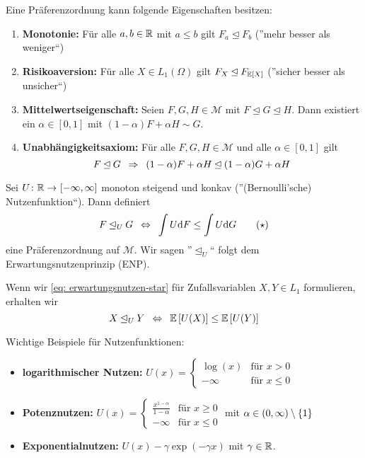 Eine Präferenzordnung kann folgende Eigenschaften besitzen:
\begin{enumerate}[label=(\Roman*)]
	\item \textbf{Monotonie:} Für alle $a,b \in \mathbb{R}$ mit $a \le b$ gilt $F_a \unlhd F_b$ (''mehr besser als weniger``)
	\item \textbf{Risikoaversion:} Für alle $X \in L_1(\Omega)$ gilt $F_X \unlhd F_{\mathbb{E} \left[ X \right]}$ (''sicher besser als unsicher``)
	\item \textbf{Mittelwertseigenschaft:} Seien $F,G,H \in \mathcal{M}$ mit $F \unlhd G \unlhd H$. Dann existiert ein $\alpha \in [0,1]$ mit $(1-\alpha) F + \alpha H \sim G$.
	\item \textbf{Unabhängigkeitsaxiom:} Für alle $F, G, H \in \mathcal{M}$ und alle $\alpha \in [0,1]$ gilt
	\begin{equation*}
		F \unlhd G \enskip \Rightarrow \enskip (1-\alpha) F + \alpha H \unlhd (1-\alpha) G + \alpha H
	\end{equation*}
\end{enumerate}

\begin{*definition}[Erwartungsnutzen]
	Sei $\abb{U}{\R}{[-\infty, \infty]}$ monoton steigend und konkav (''(Bernoulli'sche) Nutzenfunktion``).  Dann definiert
	\begin{equation*}
		F \unlhd_U G \enskip \Leftrightarrow \enskip \int U \mathrm{d}{F} \le \int U \mathrm{d}{G}
		\tag{$\star$} \label{eq: erwartungsnutzen-star}
	\end{equation*}
	eine Präferenzordnung auf $\mathcal{M}$. Wir sagen ''$\unlhd_U$`` folgt dem Erwartungsnutzenprinzip (ENP).
\end{*definition}

\begin{*bemerkung}
	Wenn wir \eqref{eq: erwartungsnutzen-star} für Zufallsvariablen $X,Y \in L_1$ formulieren, erhalten wir 
	\begin{equation*}
		X \unlhd_U Y \enskip \Leftrightarrow \enskip \mathbb{E} \left[ U(X) \right] \le \mathbb{E} \left[ U(Y) \right]
	\end{equation*}
\end{*bemerkung}

\begin{*beispiel}
	Wichtige Beispiele für Nutzenfunktionen:
	\begin{itemize}
		\item \textbf{logarithmischer Nutzen:}
		$U(x) = \begin{cases}
		\log(x) & \text{für } x > 0 \\ - \infty &\text{für } x \le 0
		\end{cases}$
		\item \textbf{Potenznutzen:}
		$U(x) = \begin{cases} \frac{x^{1-\alpha}}{1 - \alpha} &\text{für } x \ge 0 \\ - \infty &\text{für } x \le 0
		\end{cases}$ mit $\alpha \in (0,\infty) \setminus \left\{ 1 \right\}$
		\item \textbf{Exponentialnutzen:} $U(x) - \gamma \exp(-\gamma x)$ mit $\gamma \in \mathbb{R}$.
	\end{itemize}
\end{*beispiel}

